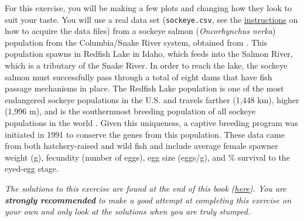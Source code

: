 \documentclass[]{book}
\theoremstyle{definition}
\theoremstyle{definition}
\theoremstyle{definition}
\theoremstyle{remark}
\begin{document}
For this exercise, you will be making a few plots and changing how they
look to suit your taste. You will use a real data set
(\texttt{sockeye.csv}, see the
\protect\hyperlink{data-sets}{instructions} on how to acquire the data
files) from a sockeye salmon (\emph{Oncorhynchus nerka}) population from
the Columbia/Snake River system, obtained from \citet{sockeye-cite}.
This population spawns in Redfish Lake in Idaho, which feeds into the
Salmon River, which is a tributary of the Snake River. In order to reach
the lake, the sockeye salmon must successfully pass through a total of
eight dams that have fish passage mechanisms in place. The Redfish Lake
population is one of the most endangered sockeye populations in the U.S.
and travels farther (1,448 km), higher (1,996 m), and is the
southernmost breeding population of all sockeye populations in the world
\citep{sockeye-cite}. Given this uniqueness, a captive breeding program
was initiated in 1991 to conserve the genes from this population. These
data came from both hatchery-raised and wild fish and include average
female spawner weight (g), fecundity (number of eggs), egg size
(eggs/g), and \% survival to the eyed-egg stage.

\emph{The solutions to this exercise are found at the end of this book
(\protect\hyperlink{ex2-answers}{here}). You are \textbf{strongly
recommended} to make a good attempt at completing this exercise on your
own and only look at the solutions when you are truly stumped.}
\end{document}
